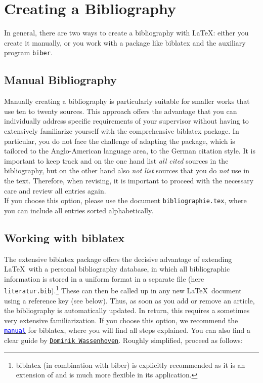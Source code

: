 
\chapter{Creating a Bibliography}

In general, there are two ways to create a bibliography with \LaTeX: either you create it manually, or you work with a package like biblatex and the auxiliary program \texttt{biber}.

\section{Manual Bibliography}
Manually creating a bibliography is particularly suitable for smaller works that use ten to twenty sources. This approach offers the advantage that you can individually address specific requirements of your supervisor without having to extensively familiarize yourself with the comprehensive biblatex package. In particular, you do not face the challenge of adapting the package, which is tailored to the Anglo-American language area, to the German citation style. It is important to keep track and on the one hand list \emph{all cited} sources in the bibliography, but on the other hand also \emph{not list} sources that you do \emph{not} use in the text. Therefore, when revising, it is important to proceed with the necessary care and review all entries again.\\
If you choose this option, please use the document \texttt{bibliographie.tex}, where you can include all entries sorted alphabetically.

\section{Working with biblatex}
The extensive biblatex package offers the decisive advantage of extending \LaTeX\ with a personal bibliography database, in which all bibliographic information is stored in a uniform format in a separate file (here \texttt{literatur.bib}).\footnote{biblatex (in combination with biber) is explicitly recommended as it is an extension of  and is much more flexible in its application.} These can then be called up in any new \LaTeX\ document using a reference key (see below). Thus, as soon as you add or remove an article, the bibliography is automatically updated. In return, this requires a sometimes very extensive familiarization. If you choose this option, we recommend the \href{https://texdoc.org/pkg/biblatex}{\textcolor{blue}{\texttt{manual}}} for biblatex, where you will find all steps explained. You can also find a clear guide by \href{http://www.nagel-net.de/Latex/DOKU/DTK-4_2008-biblatex-Teil2.pdf}{\color{blue}\texttt{Dominik Wassenhoven}}. Roughly simplified, proceed as follows:\\

